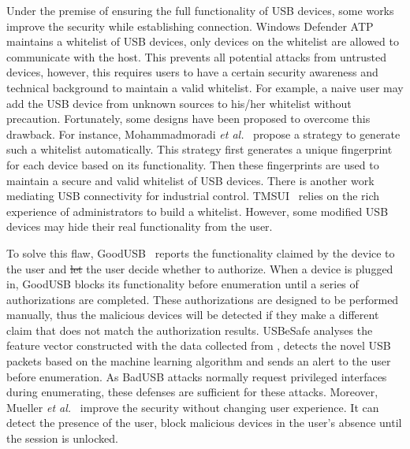 \documentclass[conference]{IEEEtran}
\newcommand{\shuqing}[1]{}
\providecommand{\DIFaddtex}[1]{{\protect\color{blue}\uwave{#1}}} %
\providecommand{\DIFdeltex}[1]{{\protect\color{red}\sout{#1}}}                      %
\providecommand{\DIFaddbegin}{} %
\providecommand{\DIFaddend}{} %
\providecommand{\DIFdelbegin}{} %
\providecommand{\DIFdelend}{} %
\providecommand{\DIFadd}[1]{\texorpdfstring{\DIFaddtex{#1}}{#1}} %
\providecommand{\DIFdel}[1]{\texorpdfstring{\DIFdeltex{#1}}{}} %
\newcommand{\DIFscaledelfig}{0.5}
\newlength{\DIFdelgraphicswidth} %
\newlength{\DIFdelgraphicsheight} %
\newcommand{\DIFaddincludegraphics}[2][]{{\color{blue}\fbox{\DIFOincludegraphics[#1]{#2}}}} %
\newcommand{\DIFdelincludegraphics}[2][]{%
\sbox{\DIFdelgraphicsbox}{\DIFOincludegraphics[#1]{#2}}%
\settoboxwidth{\DIFdelgraphicswidth}{\DIFdelgraphicsbox} %
\settoboxtotalheight{\DIFdelgraphicsheight}{\DIFdelgraphicsbox} %
\scalebox{\DIFscaledelfig}{%
\parbox[b]{\DIFdelgraphicswidth}{\usebox{\DIFdelgraphicsbox}\\[-\baselineskip] \rule{\DIFdelgraphicswidth}{0em}}\llap{\resizebox{\DIFdelgraphicswidth}{\DIFdelgraphicsheight}{%
\setlength{\unitlength}{\DIFdelgraphicswidth}%
\begin{picture}(1,1)%
\thicklines\linethickness{2pt} %
{\color[rgb]{1,0,0}\put(0,0){\framebox(1,1){}}}%
{\color[rgb]{1,0,0}\put(0,0){\line( 1,1){1}}}%
{\color[rgb]{1,0,0}\put(0,1){\line(1,-1){1}}}%
\end{picture}%
}\hspace*{3pt}}} %
} %
\DeclareRobustCommand{\DIFaddbegin}{\DIFOaddbegin \let\includegraphics\DIFaddincludegraphics} %
\DeclareRobustCommand{\DIFaddend}{\DIFOaddend \let\includegraphics\DIFOincludegraphics} %
\DeclareRobustCommand{\DIFdelbegin}{\DIFOdelbegin \let\includegraphics\DIFdelincludegraphics} %
\DeclareRobustCommand{\DIFdelend}{\DIFOaddend \let\includegraphics\DIFOincludegraphics} %
\begin{document}
Under the premise of ensuring the full functionality of \ac{USB} devices, some works
improve the security while establishing connection. Windows Defender
ATP~\cite{windenfenderwhite} maintains a whitelist of \ac{USB} devices, only devices
on the whitelist are allowed to communicate with the host. This prevents all
potential attacks from untrusted devices, however, this requires users to have a
certain security awareness and technical background to maintain a valid
whitelist. For example, a naive user may add the \ac{USB} device from unknown
sources to his/her whitelist without precaution. Fortunately, some designs have been proposed to overcome
this drawback. For instance, Mohammadmoradi \emph{et al.}~\cite{mohammadmoradi2018making}\shuqing{check name} propose a strategy to generate such a
whitelist automatically. This strategy first generates a unique fingerprint for
each device based on its functionality. Then these fingerprints are used to
maintain a secure and valid whitelist of \ac{USB} devices. There is another work
mediating \ac{USB} connectivity for industrial control. TMSUI~\cite{yang2015tmsui}
relies on the rich experience of administrators to build a whitelist. However, some
modified \ac{USB} devices may hide their real functionality from the user.

To solve this flaw, GoodUSB~\cite{tian2015defending} reports the functionality claimed
by the device to the user and \DIFdelbegin \DIFdel{let }\DIFdelend \DIFaddbegin \DIFadd{lets }\DIFaddend the user decide whether to authorize. When a device
is plugged in, GoodUSB blocks its functionality before enumeration until a
series of authorizations are completed. These authorizations are designed to be
performed manually, thus the malicious devices will be detected if they make a different claim 
that does not match the authorization results. 
USBeSafe\cite{usbesafe} analyses the 
feature vector constructed with the data collected from \DIFdelbegin %
\DIFdelend \DIFaddbegin \DIFadd{USB Request Blocks}\DIFaddend , 
detects the novel \ac{USB} packets based on the machine learning algorithm and sends 
an alert to the user before enumeration. As BadUSB attacks normally request privileged 
interfaces during enumerating, these defenses are sufficient for these attacks.
Moreover, Mueller \emph{et al.}~\cite{MuellerZN19} improve the security without changing user experience. It can detect the presence of the user, block malicious devices in the user's absence until the session is unlocked.
\end{document}
